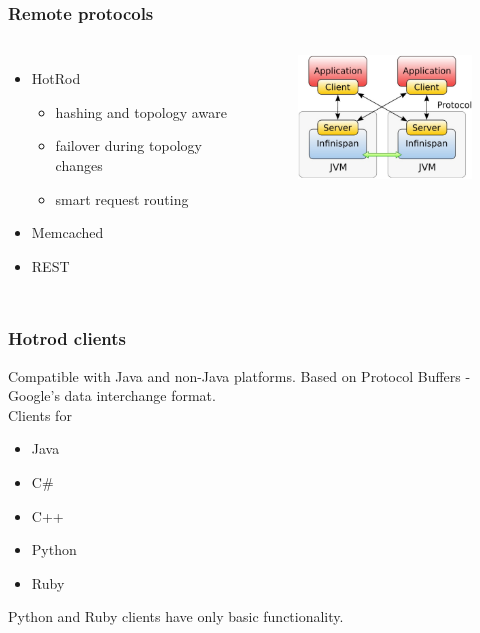 \documentclass[10pt,utf8]{beamer}
\begin{document}
\begin{frame}
	\frametitle{Remote protocols}
	\begin{columns}
		\begin{itemize}
			\item HotRod
				\begin{itemize}
					\item hashing and topology aware
					\item failover during topology changes
					\item smart request routing
				\end{itemize}
			\item Memcached
			\item REST
		\end{itemize}
		\begin{figure}
			\includegraphics[width=5cm]{./img/ispn-cs.eps}
		\end{figure}
	\end{columns}
\end{frame}

\begin{frame}
  \frametitle{Hotrod clients}
	Compatible with Java and non-Java platforms. Based on Protocol Buffers - Google's data interchange format.\\
	\vspace{0.5cm}
	Clients for
	\begin{itemize}
		\item Java
		\item C\#
		\item C++
		\item Python
		\item Ruby
	\end{itemize}
	Python and Ruby clients have only basic functionality.
\end{frame}
\end{document}
